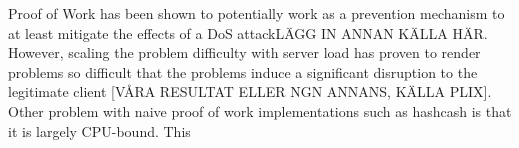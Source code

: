 Proof of Work has been shown to potentially work as a prevention mechanism to at least mitigate the effects of a DoS attack\cite{subpuzzles}LÄGG IN ANNAN KÄLLA HÄR. However, scaling the problem difficulty with server load has proven to render problems so difficult that the problems induce a significant disruption to the legitimate client [VÅRA RESULTAT ELLER NGN ANNANS, KÄLLA PLIX]. Other problem with naive proof of work implementations such as hashcash is that it is largely CPU-bound\cite{hashcashbench}. This 


\begin{comment}
Proof of Work has been shown to potentially work as a prevention mechanism to at least mitigate the effects of a DoS attack without making an as assumption about the source.[källa] However, \citeauthor{LaurieC04} concluded in the paper \citetitle{LaurieC04}, that PoW on it's own, is not a feasible solution to fighting spam and denial of service attacks. This is because the classical implementation of Proof of Work does not seperate legitimate users from attackers. Hence, problems from a Proof of Work protected system would not discourage abusers of the system without having an unacceptable effect on legitimate users. 
\end{comment}